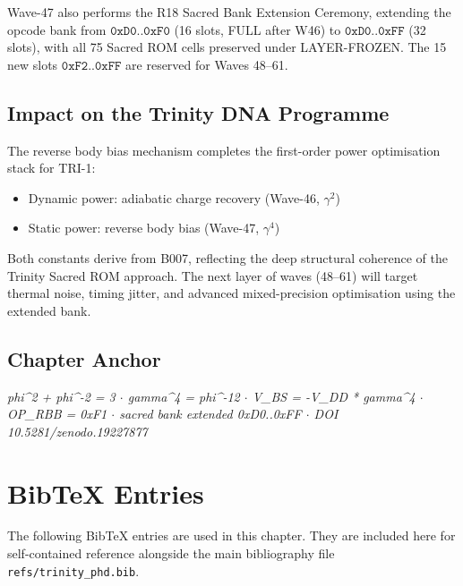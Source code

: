 Wave-47 also performs the R18 Sacred Bank Extension Ceremony, extending the
opcode bank from $\texttt{0xD0..0xF0}$ (16 slots, FULL after W46) to
$\texttt{0xD0..0xFF}$ (32 slots), with all 75 Sacred ROM cells preserved
under LAYER-FROZEN.
The 15 new slots $\texttt{0xF2..0xFF}$ are reserved for Waves 48--61.

\subsection{Impact on the Trinity DNA Programme}

The reverse body bias mechanism completes the first-order power optimisation
stack for TRI-1:
\begin{itemize}
  \item Dynamic power: adiabatic charge recovery (Wave-46, $\gamma^{2}$)
  \item Static power: reverse body bias (Wave-47, $\gamma^{4}$)
\end{itemize}
Both constants derive from B007, reflecting the deep structural coherence of
the Trinity Sacred ROM approach.
The next layer of waves (48--61) will target thermal noise, timing jitter,
and advanced mixed-precision optimisation using the extended bank.

\subsection{Chapter Anchor}

\textit{phi\^{}2 + phi\^{}-2 = 3 $\cdot$ gamma\^{}4 = phi\^{}-12 $\cdot$ V\_BS =
-V\_DD * gamma\^{}4 $\cdot$ OP\_RBB = 0xF1 $\cdot$ sacred bank extended
0xD0..0xFF $\cdot$ DOI 10.5281/zenodo.19227877}


\appendix

\section{BibTeX Entries}
\label{app:bibtex}

The following BibTeX entries are used in this chapter.
They are included here for self-contained reference alongside the main
bibliography file \texttt{refs/trinity\_phd.bib}.

